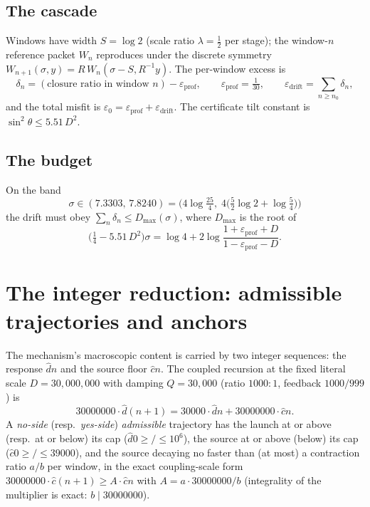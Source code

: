 \documentclass[11pt]{article}
\newcommand{\dhat}{\widehat{d}}
\newcommand{\chat}{\widehat{c}}
\theoremstyle{plain}
\theoremstyle{definition}
\begin{document}
\subsection{The cascade}
Windows have width $S=\log 2$ (scale ratio $\lambda=\tfrac12$ per stage); the window-$n$
reference packet $W_n$ reproduces under the discrete symmetry
$W_{n+1}(\sigma,y)=R\,W_n(\sigma-S,R^{-1}y)$. The per-window excess is
\[
\delta_n=(\text{closure ratio in window } n)-\varepsilon_{\mathrm{prof}},
\qquad \varepsilon_{\mathrm{prof}}=\tfrac1{30},
\qquad \varepsilon_{\mathrm{drift}}=\sum_{n\ge n_0}\delta_n,
\]
and the total misfit is $\varepsilon_0=\varepsilon_{\mathrm{prof}}+\varepsilon_{\mathrm{drift}}$.
The certificate tilt constant is $\sin^2\theta\le 5.51\,D^2$.

\subsection{The budget}
On the band
\[
\sigma\in(7.3303,\,7.8240)
=\bigl(4\log\tfrac{25}{4},\;4\bigl(\tfrac52\log 2+\log\tfrac54\bigr)\bigr)
\]
the drift must obey $\sum_n\delta_n\le D_{\max}(\sigma)$, where $D_{\max}$ is the root of
\[
\bigl(\tfrac14-5.51\,D^2\bigr)\sigma
=\log 4+2\log\frac{1+\varepsilon_{\mathrm{prof}}+D}{1-\varepsilon_{\mathrm{prof}}-D}.
\]

\section{The integer reduction: admissible trajectories and anchors}\label{sec:reduction}

The mechanism's macroscopic content is carried by two integer sequences: the response
$\dhat n$ and the source floor $\chat n$. The coupled recursion at the fixed literal scale
$D=30{,}000{,}000$ with damping $Q=30{,}000$ (ratio $1000:1$, feedback $1000/999$) is
\begin{equation}\label{eq:coupling}
30000000\cdot \dhat(n+1)=30000\cdot \dhat n+30000000\cdot \chat n .
\end{equation}
A \emph{no-side} (resp.\ \emph{yes-side}) \emph{admissible} trajectory has the launch at or
above (resp.\ at or below) its cap ($\dhat 0\ge/\le 10^6$), the source at or above (below)
its cap ($\chat 0\ge/\le 39000$), and the source decaying no faster than (at most) a
contraction ratio $a/b$ per window, in the exact coupling-scale form
$30000000\cdot\chat(n+1)\ge A\cdot\chat n$ with $A=a\cdot 30000000/b$
(integrality of the multiplier is exact: $b\mid 30000000$).
\end{document}
